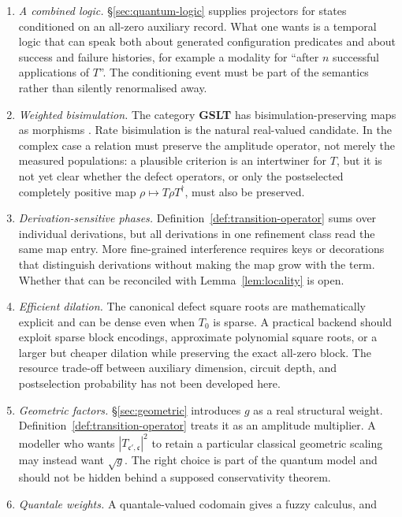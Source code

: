 \documentclass[11pt,a4paper]{article}
\theoremstyle{plain}
\theoremstyle{definition}
\theoremstyle{remark}
\newcommand{\gfac}{g}
\begin{document}
\begin{enumerate}[leftmargin=2.2em]
\item \emph{A combined logic.} \S\ref{sec:quantum-logic} supplies projectors for states conditioned on
an all-zero auxiliary record. What one wants is a temporal logic that can speak both about generated
configuration predicates and about success and failure histories, for example a modality for ``after
$n$ successful applications of $T$''. The conditioning event must be part of the semantics rather
than silently renormalised away.
\item \emph{Weighted bisimulation.} The category \textbf{GSLT} has bisimulation-preserving maps as
morphisms \cite{omnibus}. Rate bisimulation is the natural real-valued candidate. In the complex case
a relation must preserve the amplitude operator, not merely the measured populations: a plausible
criterion is an intertwiner for $T$, but it is not yet clear whether the defect operators, or only the
postselected completely positive map $\rho\mapsto T\rho T^\dagger$, must also be preserved.
\item \emph{Derivation-sensitive phases.} Definition~\ref{def:transition-operator} sums over
individual derivations, but all derivations in one refinement class read the same map entry. More
fine-grained interference requires keys or decorations that distinguish derivations without making
the map grow with the term. Whether that can be reconciled with Lemma~\ref{lem:locality} is open.
\item \emph{Efficient dilation.} The canonical defect square roots are mathematically explicit and can
be dense even when $T_0$ is sparse. A practical backend should exploit sparse block encodings,
approximate polynomial square roots, or a larger but cheaper dilation while preserving the exact
all-zero block. The resource trade-off between auxiliary dimension, circuit depth, and postselection
probability has not been developed here.
\item \emph{Geometric factors.} \S\ref{sec:geometric} introduces $\gfac$ as a real structural
weight. Definition~\ref{def:transition-operator} treats it as an amplitude multiplier. A modeller who
wants $|T_{\mathfrak{c}',\mathfrak{c}}|^2$ to retain a particular classical geometric scaling may
instead want $\sqrt{\gfac}$. The right choice is part of the quantum model and should not be hidden
behind a supposed conservativity theorem.
\item \emph{Quantale weights.} A quantale-valued codomain gives a fuzzy calculus, and \cite{fuzzy}

\end{enumerate}
\end{document}
